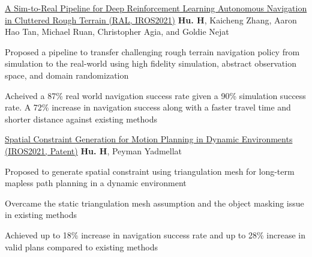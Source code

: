 


\begin{cventries}
  \cvpublicationentrysimple
    {\href{https://ieeexplore.ieee.org/document/9468918}{A Sim-to-Real Pipeline for Deep Reinforcement Learning Autonomous Navigation in Cluttered Rough Terrain (RAL, IROS2021)}} %
    {\textbf{Hu. H}, Kaicheng Zhang, Aaron Hao Tan, Michael Ruan, Christopher Agia, and Goldie Nejat} %
    {
    \begin{cvitems}
      \item{
        Proposed a pipeline to transfer challenging rough terrain navigation policy from simulation to the real-world using high fidelity simulation, abstract observation space, and domain randomization
      }
      \item{
        Acheived a 87\% real world navigation success rate given a 90\% simulation success rate. A 72\% increase in navigation success along with a faster travel time and shorter distance against existing methods
			}
    \end{cvitems}
    }
  \cvpublicationentrysimple
    {\href{https://arxiv.org/abs/2110.14786}{Spatial Constraint Generation for Motion Planning in Dynamic Environments (IROS2021, Patent)}} %
    {\textbf{Hu. H}, Peyman Yadmellat} %
    {
    \begin{cvitems}
      \item {Proposed to generate spatial constraint using triangulation mesh for long-term mapless path planning in a dynamic environment}
      \item {Overcame the static triangulation mesh assumption and the object masking issue in existing methods
      }
      \item {Achieved up to 18\% increase in navigation success rate and up to 28\% increase in valid plans compared to existing methods}

\end{cvitems}}
\end{cventries}
